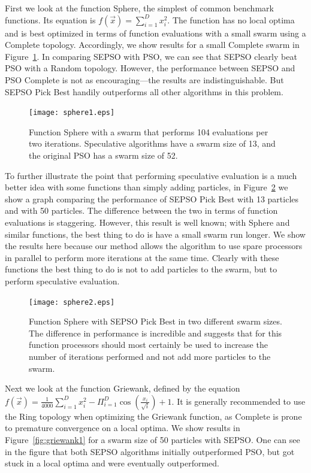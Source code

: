 \documentclass[conference,letterpaper]{IEEEtran}
\newcommand{\fig}[1]{Figure~\ref{fig:#1}}
\begin{document}
First we look at the function Sphere, the simplest of common benchmark
functions.  Its equation is $f(\Vec{x}) = \sum_{i=1}^D x_i^2$.  The function
has no local optima and is best optimized in terms of function evaluations with
a small swarm using a Complete topology.  Accordingly, we show results for a
small Complete swarm in \fig{sphere1}.  In comparing SEPSO with PSO, we can see
that SEPSO clearly beat PSO with a Random topology.  However, the performance
between SEPSO and PSO Complete is not as encouraging---the results are
indistinguishable.  But SEPSO Pick Best handily outperforms all other
algorithms in this problem.

\begin{figure}
  \texttt{[image: sphere1.eps]}
  \caption{Function Sphere with a swarm that performs 104 evaluations per two
  iterations.  Speculative algorithms have a swarm size of 13, and the original
  PSO has a swarm size of 52.}
  \label{fig:sphere1}
\end{figure}

To further illustrate the point that performing speculative evaluation is a
much better idea with some functions than simply adding particles, in
\fig{sphere2} we show a graph comparing the performance of SEPSO Pick Best with
13 particles and with 50 particles.  The difference between the two in terms of
function evaluations is staggering.  However, this result is well known; with
Sphere and similar functions, the best thing to do is have a small swarm run
longer.  We show the results here because our method allows the algorithm to
use spare processors in parallel to perform more iterations at the same time.
Clearly with these functions the best thing to do is not to add particles to
the swarm, but to perform speculative evaluation.

\begin{figure}
  \texttt{[image: sphere2.eps]}
  \caption{Function Sphere with SEPSO Pick Best in two different swarm sizes.
  The difference in performance is incredible and suggests that for this
  function processors should most certainly be used to increase the number of
  iterations performed and not add more particles to the swarm.}
  \label{fig:sphere2}
\end{figure}

Next we look at the function Griewank, defined by the equation $f(\Vec{x}) =
\frac{1}{4000} \sum_{i=1}^D x_i^2 - \Pi_{i=1}^D \cos\left(\frac{x_i}{\sqrt{i}}
\right) + 1$.  It is generally recommended to use the Ring topology when
optimizing the Griewank function, as Complete is prone to premature convergence
on a local optima.  We show results in \fig{griewank1} for a swarm size of 50
particles with SEPSO.  One can see in the figure that both SEPSO algorithms
initially outperformed PSO, but got stuck in a local optima and were eventually
outperformed.  
\end{document}
